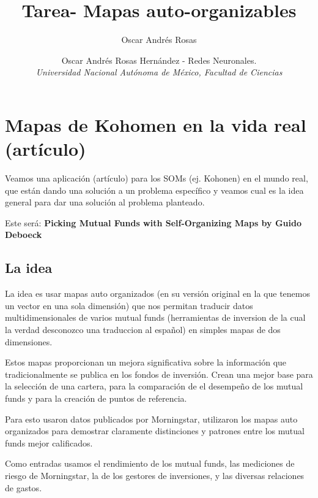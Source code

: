 \documentclass[fleqn, journal, onecolumn]{IEEEtran}             %
\author{Oscar Andrés Rosas}                                     %
\newcommand \Quote              {\qq}                           %
\theoremstyle{break}                                            %
\begin{document}
    \title{Tarea- Mapas auto-organizables}
    \author{
        Oscar Andrés Rosas Hernández - Redes Neuronales. \\
        \textit{Universidad Nacional Autónoma de México, Facultad de Ciencias}
    }

    \maketitle

    \section{Mapas de Kohomen en la vida real (artículo)}
    
      Veamos una aplicación (artículo) para los SOMs (ej. Kohonen) en el mundo real, que
      están dando una solución a un problema específico y veamos cual es la idea general
      para dar una solución al problema planteado.
      
      Este será: \textbf{Picking Mutual Funds with Self-Organizing Maps by Guido Deboeck} \cite{Visual}
      
      \subsection{La idea}
      
      La idea es usar mapas auto organizados (en su versión original en la que tenemos un vector
      en una sola dimensión) que nos permitan traducir datos multidimensionales
      de varios mutual funds (herramientas de inversion de la cual la verdad
      desconozco una traduccion al español) en simples mapas de dos dimensiones.
      
      Estos mapas proporcionan un mejora significativa sobre la información que
      tradicionalmente se publica en los fondos de inversión.
      Crean una mejor base para la selección de una cartera, para la comparación de
      el desempeño de los mutual funds y para la creación de puntos de referencia.
      
      Para esto usaron datos publicados por Morningstar, utilizaron los mapas auto organizados
      para demostrar claramente distinciones y patrones entre los mutual funds mejor calificados.
      
      Como entradas usamos el rendimiento de los mutual funds, las mediciones de riesgo de Morningstar, la
      \Quote{tenencia} de los gestores de inversiones, y las diversas relaciones de gastos.
\end{document}
